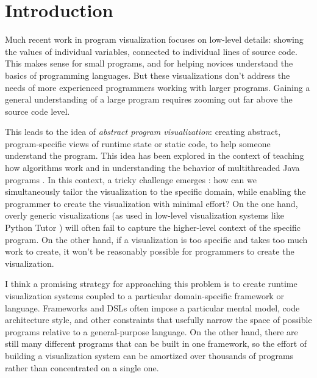 \documentclass{sigchi}
\begin{document}

\hypertarget{introduction}{%
\section{Introduction}\label{introduction}}

Much recent work in program visualization
\autocite{victora,guo2013,hoffswell2018a,pollock2019,kasibatla2018}
focuses on low-level details: showing the values of individual
variables, connected to individual lines of source code. This makes
sense for small programs, and for helping novices understand the basics
of programming languages. But these visualizations don't address the
needs of more experienced programmers working with larger programs.
Gaining a general understanding of a large program requires zooming out
far above the source code level.

This leads to the idea of \emph{abstract program visualization}:
creating abstract, program-specific views of runtime state or static
code, to help someone understand the program. This idea has been
explored in the context of teaching how algorithms work
\autocite{brown1984,stasko1990} and in understanding the behavior of
multithreaded Java programs \autocite{reiss2003,reiss2005}. In this
context, a tricky challenge emerges \autocite{reiss2007}: how can we
simultaneously tailor the visualization to the specific domain, while
enabling the programmer to create the visualization with minimal effort?
On the one hand, overly generic visualizations (as used in low-level
visualization systems like Python Tutor \autocite{guo2013}) will often
fail to capture the higher-level context of the specific program. On the
other hand, if a visualization is too specific and takes too much work
to create, it won't be reasonably possible for programmers to create the
visualization.

I think a promising strategy for approaching this problem is to create
runtime visualization systems coupled to a particular domain-specific
framework or language. Frameworks and DSLs often impose a particular
mental model, code architecture style, and other constraints that
usefully narrow the space of possible programs relative to a
general-purpose language. On the other hand, there are still many
different programs that can be built in one framework, so the effort of
building a visualization system can be amortized over thousands of
programs rather than concentrated on a single one.
\end{document}
